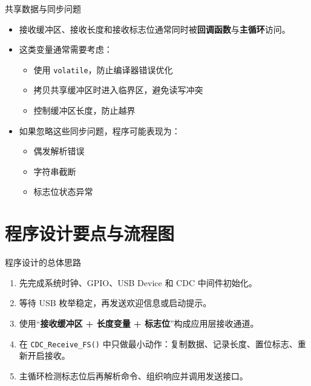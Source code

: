 \documentclass[11pt,aspectratio=169]{ctexbeamer}
\newcommand{\code}[1]{\texttt{#1}}
\newcommand{\term}[1]{\textbf{\color{PrimaryBlue}#1}}
\begin{document}
\begin{frame}{共享数据与同步问题}
  \begin{itemize}
    \item 接收缓冲区、接收长度和接收标志位通常同时被\term{回调函数}与\term{主循环}访问。
    \item 这类变量通常需要考虑：
      \begin{itemize}
        \item 使用 \code{volatile}，防止编译器错误优化
        \item 拷贝共享缓冲区时进入临界区，避免读写冲突
        \item 控制缓冲区长度，防止越界
      \end{itemize}
    \item 如果忽略这些同步问题，程序可能表现为：
      \begin{itemize}
        \item 偶发解析错误
        \item 字符串截断
        \item 标志位状态异常
      \end{itemize}
  \end{itemize}
\end{frame}

\section{程序设计要点与流程图}

\begin{frame}{程序设计的总体思路}
  \begin{enumerate}
    \item 先完成系统时钟、GPIO、USB Device 和 CDC 中间件初始化。
    \item 等待 USB 枚举稳定，再发送欢迎信息或启动提示。
    \item 使用“\term{接收缓冲区 + 长度变量 + 标志位}”构成应用层接收通道。
    \item 在 \code{CDC\_Receive\_FS()} 中只做最小动作：复制数据、记录长度、置位标志、重新开启接收。
    \item 主循环检测标志位后再解析命令、组织响应并调用发送接口。
  \end{enumerate}
\end{frame}
\end{document}
